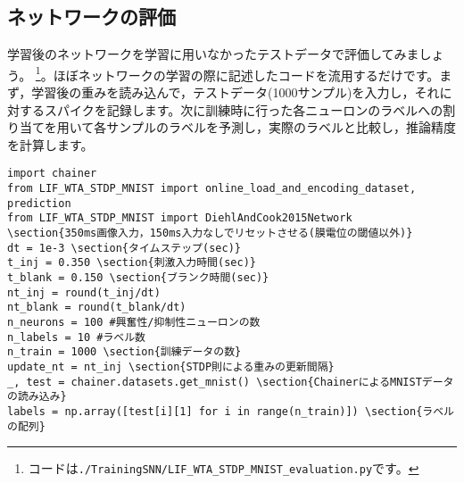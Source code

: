 \subsection{ネットワークの評価}
学習後のネットワークを学習に用いなかったテストデータで評価してみましょう。
\footnote{コードは\texttt{./TrainingSNN/LIF\_WTA\_STDP\_MNIST\_evaluation.py}です。}。ほぼネットワークの学習の際に記述したコードを流用するだけです。まず，学習後の重みを読み込んで，テストデータ(1000サンプル)を入力し，それに対するスパイクを記録します。次に訓練時に行った各ニューロンのラベルへの割り当てを用いて各サンプルのラベルを予測し，実際のラベルと比較し，推論精度を計算します。
\begin{verbatim}
import chainer
from LIF_WTA_STDP_MNIST import online_load_and_encoding_dataset, prediction
from LIF_WTA_STDP_MNIST import DiehlAndCook2015Network
\section{350ms画像入力，150ms入力なしでリセットさせる(膜電位の閾値以外)}
dt = 1e-3 \section{タイムステップ(sec)}
t_inj = 0.350 \section{刺激入力時間(sec)}
t_blank = 0.150 \section{ブランク時間(sec)}
nt_inj = round(t_inj/dt)
nt_blank = round(t_blank/dt)
n_neurons = 100 #興奮性/抑制性ニューロンの数
n_labels = 10 #ラベル数
n_train = 1000 \section{訓練データの数}
update_nt = nt_inj \section{STDP則による重みの更新間隔}
_, test = chainer.datasets.get_mnist() \section{ChainerによるMNISTデータの読み込み}
labels = np.array([test[i][1] for i in range(n_train)]) \section{ラベルの配列}

\end{verbatim}
